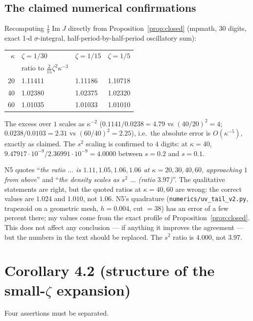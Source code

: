 \documentclass[11pt]{article}
\begin{document}
\subsection{The claimed numerical confirmations}
Recomputing $\tfrac1\pi\operatorname{Im}J$ directly from Proposition~\ref{prop:closed}
(mpmath, 30 digits, exact 1-d $\sigma$-integral, half-period-by-half-period oscillatory sum):
\begin{center}\small
\begin{tabular}{r l l l}\toprule
$\kappa$ & $\zeta=1/30$ & $\zeta=1/15$ & $\zeta=1/5$\\
& ratio to $\tfrac2{15}\zeta^2\kappa^{-3}$ & & \\\midrule
20 & 1.11411 & 1.11186 & 1.10718\\
40 & 1.02380 & 1.02375 & 1.02320\\
60 & 1.01035 & 1.01033 & 1.01010\\\bottomrule
\end{tabular}\end{center}
The excess over $1$ scales as $\kappa^{-2}$ ($0.1141/0.0238=4.79$ vs $(40/20)^2=4$;
$0.0238/0.0103=2.31$ vs $(60/40)^2=2.25$), i.e.\ the absolute error is $O(\kappa^{-5})$, exactly as
claimed.  The $s^2$ scaling is confirmed to $4$ digits: at $\kappa=40$,
$9.47917\cdot10^{-9}/2.36991\cdot10^{-9}=4.0000$ between $s=0.2$ and $s=0.1$.
\begin{verdictgap}
N5 quotes ``\emph{the ratio $\dots$ is $1.11,1.05,1.06,1.06$ at $\kappa=20,30,40,60$, approaching
$1$ from above}'' and ``\emph{the density scales as $s^2$ $\dots$ (ratio $3.97$)}''.  The
qualitative statements are right, but the quoted ratios at $\kappa=40,60$ are wrong: the correct
values are $1.024$ and $1.010$, not $1.06$.  N5's quadrature
(\texttt{numerics/uv\_tail\_v2.py}, trapezoid on a geometric mesh, $h=0.004$, cut $=38$) has an
error of a few percent there; my values come from the exact profile of
Proposition~\ref{prop:closed}.  This does not affect any conclusion --- if anything it improves the
agreement --- but the numbers in the text should be replaced.  The $s^2$ ratio is $4.000$, not $3.97$.
\end{verdictgap}

\section{Corollary 4.2 (structure of the small-$\zeta$ expansion)}\label{sec:cor42}

Four assertions must be separated.
\end{document}
